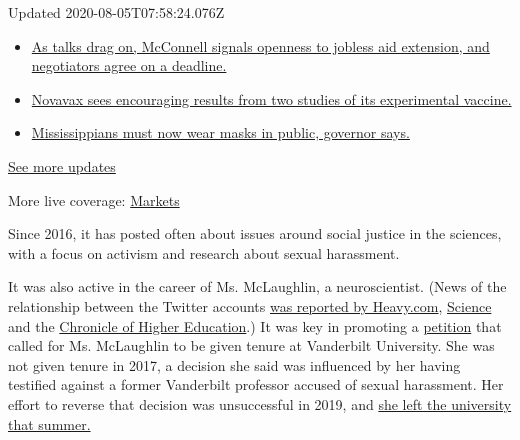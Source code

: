 Updated 2020-08-05T07:58:24.076Z

\begin{itemize}
\tightlist
\item
  \href{https://www.nytimes.com/2020/08/04/world/coronavirus-cases.html?action=click\&pgtype=Article\&state=default\&region=MAIN_CONTENT_1\&context=storylines_live_updates\#link-762df92}{As
  talks drag on, McConnell signals openness to jobless aid extension,
  and negotiators agree on a deadline.}
\item
  \href{https://www.nytimes.com/2020/08/04/world/coronavirus-cases.html?action=click\&pgtype=Article\&state=default\&region=MAIN_CONTENT_1\&context=storylines_live_updates\#link-1228a480}{Novavax
  sees encouraging results from two studies of its experimental
  vaccine.}
\item
  \href{https://www.nytimes.com/2020/08/04/world/coronavirus-cases.html?action=click\&pgtype=Article\&state=default\&region=MAIN_CONTENT_1\&context=storylines_live_updates\#link-794484ed}{Mississippians
  must now wear masks in public, governor says.}
\end{itemize}

\href{https://www.nytimes.com/2020/08/04/world/coronavirus-cases.html?action=click\&pgtype=Article\&state=default\&region=MAIN_CONTENT_1\&context=storylines_live_updates}{See
more updates}

More live coverage:
\href{https://www.nytimes.com/live/2020/08/04/business/stock-market-today-coronavirus?action=click\&pgtype=Article\&state=default\&region=MAIN_CONTENT_1\&context=storylines_live_updates}{Markets}

Since 2016, it has posted often about issues around social justice in
the sciences, with a focus on activism and research about sexual
harassment.

It was also active in the career of Ms. McLaughlin, a neuroscientist.
(News of the relationship between the Twitter accounts
\href{https://heavy.com/news/2020/08/sciencing_bi-bethann-mclaughlin-asu/}{was
reported by Heavy.com},
\href{https://www.sciencemag.org/news/2020/08/twitter-account-embattled-metoostem-founder-suspended}{Science}
and the
\href{https://www.chronicle.com/article/did-the-founder-of-metoostem-create-a-fake-online-persona-and-then-kill-it-off}{Chronicle
of Higher Education}.) It was key in promoting a
\href{https://www.change.org/p/vanderbilt-don-t-fire-prof-bethann-mclaughlin-for-standing-against-sexual-harassment}{petition}
that called for Ms. McLaughlin to be given tenure at Vanderbilt
University. She was not given tenure in 2017, a decision she said was
influenced by her having testified against a former Vanderbilt professor
accused of sexual harassment. Her effort to reverse that decision was
unsuccessful in 2019, and
\href{https://www.sciencemag.org/news/2019/07/metoostem-founder-out-vanderbilt}{she
left the university that summer.}

